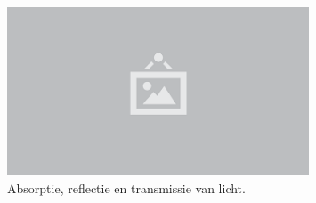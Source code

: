\begin{figure}
  \centering
  \includegraphics[width=0.8\textwidth]{./img/raw/placeholder.png}
  \caption{Absorptie, reflectie en transmissie van licht.}
  \label{fig:fw-licht}
\end{figure}
